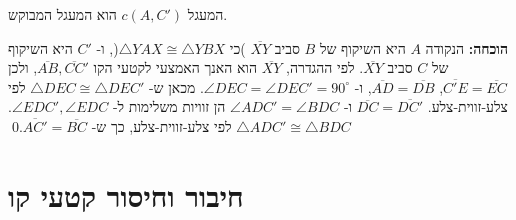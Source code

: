 המעגל
$c(A,C')$
הוא המעגל המבוקש.


\textbf{הוכחה:}
הנקודה
$A$
היא השיקוף של 
$B$
סביב 
$\overline{XY}$
)כי
$\triangle YAX\cong \triangle YBX$(, ו-%
$C'$
היא השיקוף של 
$C$
סביב
$\overline{XY}$.
לפי ההגדרה, 
$\overline{XY}$
הוא האנך האמצעי לקטעי הקו 
$\overline{AB},\overline{CC}'$,
ולכן
$\overline{C'E}=\overline{EC}$,
$\overline{AD}=\overline{DB}$,
ו-%
$\angle DEC=\angle DEC'=90^\circ$.
מכאן ש-%
$\triangle DEC\cong\triangle DEC'$
לפי צלע-זווית-צלע.
$\overline{DC}=\overline{DC'}$
ו-%
$\angle ADC'=\angle BDC$
הן זוויות משלימות ל-%
$\angle EDC', \angle EDC$.
$\triangle ADC'\cong\triangle BDC$
לפי צלע-זווית-צלע,
כך ש-%
$\overline{AC'}=\overline{BC}$.\qed


\section{חיבור וחיסור קטעי קו}

